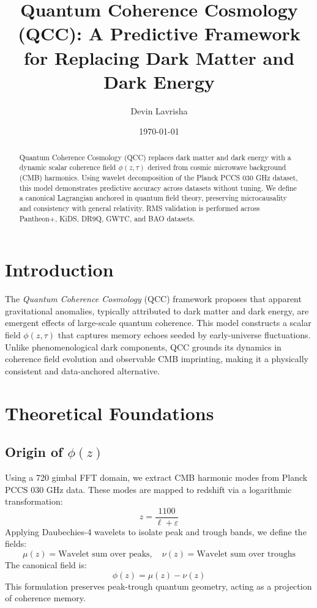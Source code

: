 \documentclass[12pt]{article}
\title{Quantum Coherence Cosmology (QCC): A Predictive Framework for Replacing Dark Matter and Dark Energy}
\author{Devin Lavrisha}
\date{\today}
\begin{document}
	
	\maketitle
	
	\begin{abstract}
		Quantum Coherence Cosmology (QCC) replaces dark matter and dark energy with a dynamic scalar coherence field \( \phi(z, \tau) \) derived from cosmic microwave background (CMB) harmonics. Using wavelet decomposition of the Planck PCCS 030 GHz dataset, this model demonstrates predictive accuracy across datasets without tuning. We define a canonical Lagrangian anchored in quantum field theory, preserving microcausality and consistency with general relativity. RMS validation is performed across Pantheon+, KiDS, DR9Q, GWTC, and BAO datasets.
	\end{abstract}
	
	\tableofcontents
	
	\section{Introduction}
	The \textit{Quantum Coherence Cosmology} (QCC) framework proposes that apparent gravitational anomalies, typically attributed to dark matter and dark energy, are emergent effects of large-scale quantum coherence. This model constructs a scalar field \( \phi(z, \tau) \) that captures memory echoes seeded by early-universe fluctuations. Unlike phenomenological dark components, QCC grounds its dynamics in coherence field evolution and observable CMB imprinting, making it a physically consistent and data-anchored alternative.
	
	\section{Theoretical Foundations}
	\subsection{Origin of \( \phi(z) \)}
	Using a 720\textdegree{} gimbal FFT domain, we extract CMB harmonic modes from Planck PCCS 030 GHz data. These modes are mapped to redshift via a logarithmic transformation:
	\[ z = \frac{1100}{\ell + \varepsilon} \]
	Applying Daubechies-4 wavelets to isolate peak and trough bands, we define the fields:
	\[ \mu(z) = \text{Wavelet sum over peaks}, \quad \nu(z) = \text{Wavelet sum over troughs} \]
	The canonical field is:
	\[ \phi(z) = \mu(z) - \nu(z) \]
	This formulation preserves peak-trough quantum geometry, acting as a projection of coherence memory.
	
\end{document}
